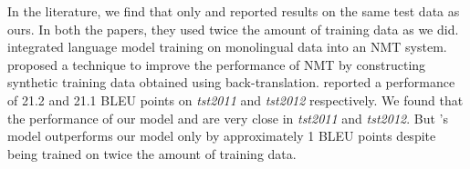 In the literature, we find that only \cite{sennrich2016improving} and \cite{gulcehre2015using} reported results on the same test data as ours. In both the papers, they used twice the amount of training data as we did. \cite{gulcehre2015using} integrated language model training on monolingual data into an NMT system. \cite{sennrich2016improving} proposed a technique to improve the performance of NMT by constructing synthetic training data obtained using back-translation. \cite{sennrich2016improving} reported a  performance of 21.2 and 21.1 BLEU points on \textit{tst2011} and \textit{tst2012} respectively. We found that the performance of our model and \citeauthor{gulcehre2015using} are very close in \textit{tst2011} and \textit{tst2012}. But \citeauthor{sennrich2016improving}'s model outperforms our model only by approximately 1 BLEU points despite being trained on twice the amount of training data.


